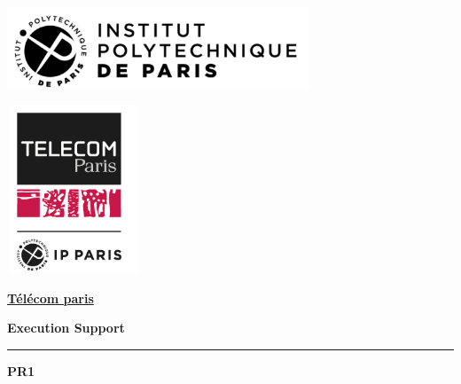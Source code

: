 \begin{titlepage}

\hspace{-0.75cm}\begin{minipage}{0.4\textwidth}
           \centering 
          \includegraphics[width=9cm]{logo_IPP.png}
    \end{minipage}
    \begin{minipage}{1\textwidth}
          \centering 
          \includegraphics[width=4cm,height=5cm]{logo_telecom.png}
    \end{minipage}
    \hspace{0.5cm}

\vspace{2cm}

\begin{center}
        \underline{\textbf{\large\Huge{Télécom paris}}} \\
        \vspace{0.5cm}
    \end{center}
    \vspace{2cm}

    \begin{center}
        \textbf{\large\Huge{Execution Support}}\\
        \vspace{0.5cm}
    \end{center}

    \vspace{1cm}

    \hrule %

 

    \begin{center}
    \Large{\textbf{\Huge{{PR1}}}}
    \end{center} 
    

\end{titlepage}
